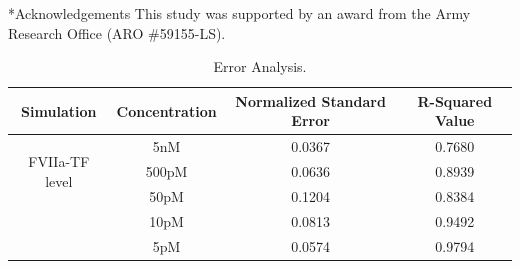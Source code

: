 \documentclass[12pt]{article}
\makeatletter
\renewcommand\section{\@startsection
	{subsection}{2}{0mm}
	{-0.2in}
	{0.05\baselineskip}
	{\normalfont\large\bfseries}}
\makeatother
\begin{document}
\section*{Acknowledgements}
This study was supported by an award from the Army Research Office (ARO \#59155-LS).
\clearpage

%


\clearpage

\begin{table}[h]
\centering
\caption{Error Analysis.}
\label{table:Error-Analysis}
\begin{center}
\begin{tabular}{ |c|c|c|c| } 
\hline
Simulation&Concentration& Normalized Standard Error & R-Squared Value \\
\hline
\multirow{3}{4em}{FVIIa-TF level} & 5nM & 0.0367 & 0.7680\\ 
& 500pM & 0.0636 & 0.8939\\
& 50pM & 0.1204 & 0.8384\\ 
& 10pM & 0.0813 & 0.9492\\
& 5pM & 0.0574 & 0.9794\\ 
\hline
\end{tabular}
\end{center}
\end{table}


\begin{table}[h]
\centering
\caption{Table with optimization settings and results for coagulation and different benchmarks using DdPSO.}
\label{table:benchmark-problems}
\end{table}
\end{document}
